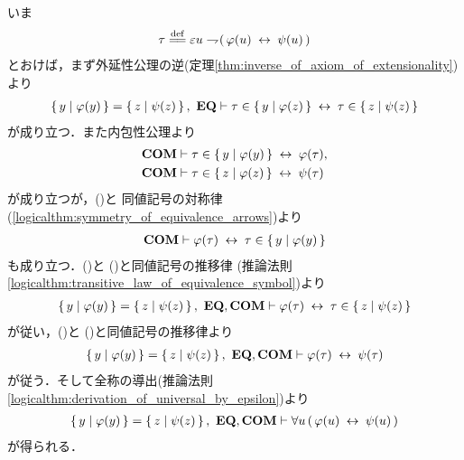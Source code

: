 	\begin{sketch}
		いま
		\begin{align}
			\tau \defeq \varepsilon u \negation (\, \varphi(u) \lrarrow \psi(u)\, )
		\end{align}
		とおけば，まず外延性公理の逆(定理\ref{thm:inverse_of_axiom_of_extensionality})より
		\begin{align}
			\left\{\, y \mid \varphi(y)\, \right\} = \left\{\, z \mid \psi(z)\, \right\},\ \mbox{{\bf EQ}} \vdash 
			\tau \in \left\{\, y \mid \varphi(z)\, \right\} \hspace{0.25em}\leftrightarrow\hspace{0.25em} \tau \in \left\{\, z \mid \psi(z)\, \right\}
			\label{fom:equivalent_formula_rewriting_5_1}
		\end{align}
		が成り立つ．また内包性公理より
		\begin{align}
			\mbox{\bf COM} &\vdash \tau \in \left\{\, y \mid \varphi(y)\, \right\} \hspace{0.25em}\leftrightarrow\hspace{0.25em} \varphi(\tau), 
			\label{fom:equivalent_formula_rewriting_5_2} \\
			\mbox{\bf COM} &\vdash \tau \in \left\{\, z \mid \varphi(z)\, \right\} \hspace{0.25em}\leftrightarrow\hspace{0.25em} \psi(\tau)
			\label{fom:equivalent_formula_rewriting_5_3}
		\end{align}
		が成り立つが，()と
		同値記号の対称律(\ref{logicalthm:symmetry_of_equivalence_arrows})より
		\begin{align}
			\mbox{\bf COM} \vdash \varphi(\tau) \hspace{0.25em}\leftrightarrow\hspace{0.25em} \tau \in \left\{\, y \mid \varphi(y)\, \right\}
			\label{fom:equivalent_formula_rewriting_5_4}
		\end{align}
		も成り立つ．()と
		()と同値記号の推移律
		(推論法則\ref{logicalthm:transitive_law_of_equivalence_symbol})より
		\begin{align}
			\left\{\, y \mid \varphi(y)\, \right\} = \left\{\, z \mid \psi(z)\, \right\},\ \mbox{{\bf EQ}},\mbox{\bf COM} \vdash
			 \varphi(\tau) \hspace{0.25em}\leftrightarrow\hspace{0.25em} \tau \in \left\{\, z \mid \psi(z)\, \right\}
			\label{fom:equivalent_formula_rewriting_5_5}
		\end{align}
		が従い，()と
		()と同値記号の推移律より
		\begin{align}
			\left\{\, y \mid \varphi(y)\, \right\} = \left\{\, z \mid \psi(z)\, \right\},\ \mbox{{\bf EQ}},\mbox{\bf COM} \vdash
			\varphi(\tau) \hspace{0.25em}\leftrightarrow\hspace{0.25em} \psi(\tau)
		\end{align}
		が従う．そして全称の導出(推論法則\ref{logicalthm:derivation_of_universal_by_epsilon})より
		\begin{align}
			\left\{\, y \mid \varphi(y)\, \right\} = \left\{\, z \mid \psi(z)\, \right\},\ \mbox{{\bf EQ}},\mbox{\bf COM} \vdash
			\forall u\, (\, \varphi(u) \hspace{0.25em}\leftrightarrow\hspace{0.25em} \psi(u)\, )
		\end{align}
		が得られる．
		\QED
	\end{sketch}
	
